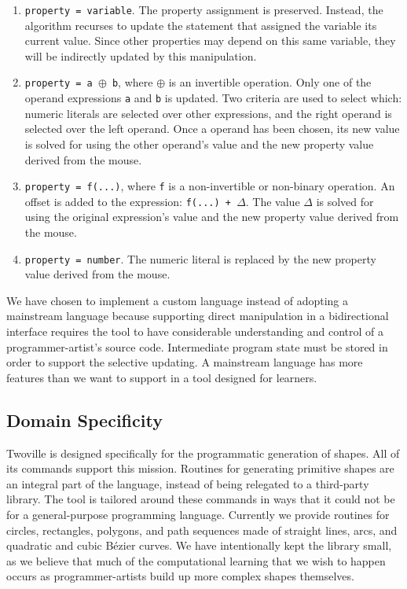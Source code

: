 \begin{enumerate}
\item \texttt{property = variable}. The property assignment is preserved. Instead, the algorithm recurses to update the statement that assigned the variable its current value. Since other properties may depend on this same variable, they will be indirectly updated by this manipulation.
\item \texttt{property = a $\oplus$ b}, where $\oplus$ is an invertible operation. Only one of the operand expressions \verb=a= and \verb=b= is updated. Two criteria are used to select which: numeric literals are selected over other expressions, and the right operand is selected over the left operand. Once a operand has been chosen, its new value is solved for using the other operand's value and the new property value derived from the mouse.
\item \texttt{property = f(...)}, where \texttt{f} is a non-invertible or non-binary operation. An offset is added to the expression: \texttt{f(...) + $\Delta$}. The value $\Delta$ is solved for using the original expression's value and the new property value derived from the mouse.
\item \texttt{property = number}. The numeric literal is replaced by the new property value derived from the mouse.
\end{enumerate}

We have chosen to implement a custom language instead of adopting a mainstream language because supporting direct manipulation in a bidirectional interface requires the tool to have considerable understanding and control of a programmer-artist's source code.  Intermediate program state must be stored in order to support the selective updating. A mainstream language has more features than we want to support in a tool designed for learners. 

\subsection{Domain Specificity}

Twoville is designed specifically for the programmatic generation of shapes. All of its commands support this mission. Routines for generating primitive shapes are an integral part of the language, instead of being relegated to a third-party library. The tool is tailored around these commands in ways that it could not be for a general-purpose programming language. Currently we provide routines for circles, rectangles, polygons, and path sequences made of straight lines, arcs, and quadratic and cubic B\'{e}zier curves. We have intentionally kept the library small, as we believe that much of the computational learning that we wish to happen occurs as programmer-artists build up more complex shapes themselves.

